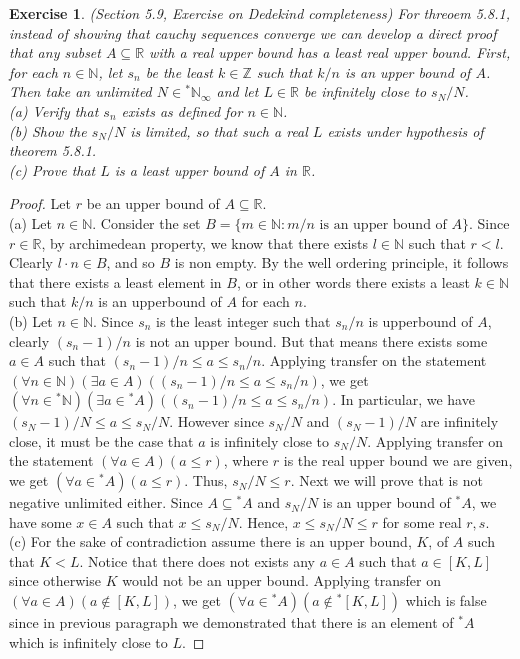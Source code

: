 \documentclass[a4paper, 11pt, openany]{book}
\theoremstyle{plain}
\newtheorem{exercise}{Exercise}[chapter]
\theoremstyle{plain}
\newcommand{\N}{\mathbb{N}}
\newcommand{\Z}{\mathbb{Z}}
\newcommand{\R}{\mathbb{R}}
\newcommand{\hyp}{{}^*}
\begin{document}
  \begin{exercise}
    (Section 5.9, Exercise on Dedekind completeness)
    For threoem 5.8.1, instead of showing that cauchy sequences converge we can develop a direct proof that any subset $A \subseteq \R$ with a real upper bound has a least real upper bound. First, for each $n \in \N$, let $s_n$ be the least $k \in \Z$ such that $k/n$ is an upper bound of $A$. Then take an unlimited $N \in \hyp \N_\infty$ and let $L \in \R$ be infinitely close to $s_N/N$. \\
    (a) Verify that $s_n$ exists as defined for $n \in \N$. \\
    (b) Show the $s_N/N$ is limited, so that such a real $L$ exists under hypothesis of theorem 5.8.1. \\
    (c) Prove that $L$ is a least upper bound of $A$ in $\R$.
  \end{exercise}
  \begin{proof} Let $r$ be an upper bound of $A \subseteq \R$. \\
    (a) Let $n \in \N$. Consider the set $B=\{m \in \N: m/n \text{ is an upper bound of } A \}$. Since $r \in \R$, by archimedean property, we know that there exists $l \in \N$ such that $r<l$. Clearly $l\cdot n \in B$, and so $B$ is non empty. By the well ordering principle, it follows that there exists a least element in $B$, or in other words there exists a least $k \in \N$ such that $k/n$ is an upperbound of $A$ for each $n$. \\

    (b) Let $n \in \N$. Since $s_n$ is the least integer such that $s_n/n$ is upperbound of $A$, clearly $(s_n-1)/n$ is not an upper bound. But that means there exists some $a \in A$ such that $(s_n-1)/n \leq a \leq s_n/n$. Applying transfer on the statement $(\forall n \in \N) (\exists a \in A) ((s_n-1)/n \leq a \leq s_n/n)$, we get $(\forall n \in \hyp \N) (\exists a \in \hyp A) ((s_n-1)/n \leq a \leq s_n/n)$. In particular, we have $(s_N-1)/N \leq a \leq s_N/N$. However since $s_N/N$ and $(s_N-1)/N$ are infinitely close, it must be the case that $a$ is infinitely close to $s_N/N$. Applying transfer on the statement $(\forall a \in A) (a \leq r)$, where $r$ is the real upper bound we are given, we get $(\forall a \in \hyp A)(a \leq r)$.  Thus, $s_N/N \leq r$. Next we will prove that is not negative unlimited either. Since $A \subseteq \hyp A$ and $s_N/N$ is an upper bound of $\hyp A$, we have some $x \in A$ such that $x \leq s_N/N$. Hence, $x \leq s_N/N \leq r$ for some real $r,s$. \\

    (c) For the sake of contradiction assume there is an upper bound, $K$, of $A$ such that $K<L$. Notice that there does not exists any $a \in A$ such that $a \in [K, L]$ since otherwise $K$ would not be an upper bound. Applying transfer on $(\forall a \in A) (a \notin [K, L])$, we get $(\forall a \in \hyp A)(a \notin \hyp [K, L])$ which is false since in previous paragraph we demonstrated that there is an element of $\hyp A$ which is infinitely close to $L$.
  \end{proof}
\end{document}
